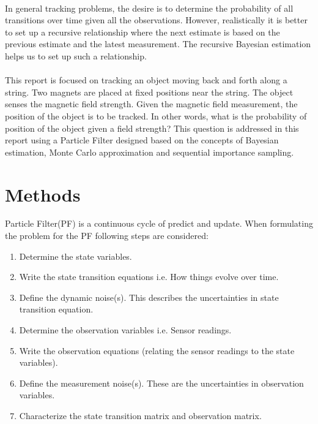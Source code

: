 \documentclass[12pt]{article}
\begin{document}
\\ \indent
In general tracking problems, the desire is to determine the probability of all transitions over time given all the observations. However, realistically it is better to set up a recursive relationship where the next estimate is based on the previous estimate and the latest measurement. The recursive Bayesian estimation helps us to set up such a relationship. \\ 
\\ \indent
This report is focused on tracking an object moving back and forth along a string. Two magnets are placed at fixed positions near the string. The object senses the magnetic field strength. Given the magnetic field measurement, the position of the object is to be tracked. In other words, what is the probability of position of the object given a field strength? This question is addressed in this report using a Particle Filter designed based on the concepts of Bayesian estimation, Monte Carlo approximation and sequential importance sampling.  

\section{Methods}
Particle Filter(PF) is a continuous cycle of predict and update. When formulating the problem for the PF following steps are considered:
\begin{enumerate}
	\item Determine the state variables.
	\item Write the state transition equations i.e. How things evolve over time.
	\item Define the dynamic noise(s).  This describes the uncertainties in state transition equation.
	\item Determine the observation variables i.e. Sensor readings.
	\item Write the observation equations (relating the sensor readings to the state variables).
	\item Define the measurement noise(s). These are the uncertainties in observation variables.
	\item Characterize the state transition matrix and observation matrix.
\end{enumerate}
\end{document}
